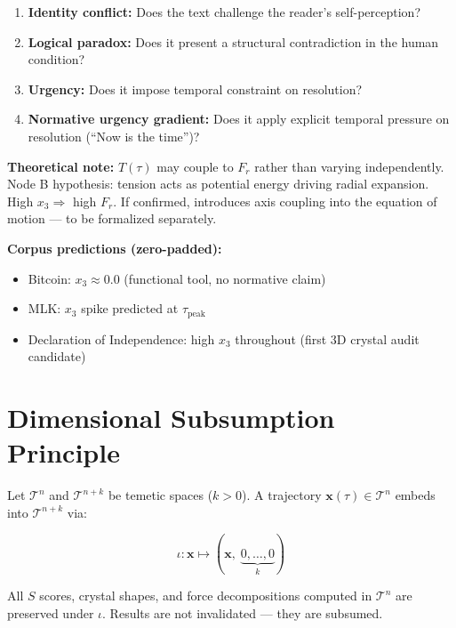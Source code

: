 \documentclass{article}
\begin{document}
\begin{enumerate}
  \item \textbf{Identity conflict:} Does the text challenge
    the reader's self-perception?
  \item \textbf{Logical paradox:} Does it present a structural
    contradiction in the human condition?
  \item \textbf{Urgency:} Does it impose temporal constraint
    on resolution?
  \item \textbf{Normative urgency gradient:} Does it apply
    explicit temporal pressure on resolution
    (``Now is the time'')?
\end{enumerate}

\textbf{Theoretical note:} $T(\tau)$ may couple to $F_r$ rather
than varying independently. Node B hypothesis: tension acts as
potential energy driving radial expansion. High $x_3 \Rightarrow$
high $F_r$. If confirmed, introduces axis coupling into the
equation of motion --- to be formalized separately.

\textbf{Corpus predictions (zero-padded):}
\begin{itemize}
  \item Bitcoin: $x_3 \approx 0.0$ (functional tool, no normative claim)
  \item MLK: $x_3$ spike predicted at $\tau_{\text{peak}}$
  \item Declaration of Independence: high $x_3$ throughout
    (first 3D crystal audit candidate)
\end{itemize}

\section{Dimensional Subsumption Principle}

Let $\mathcal{T}^n$ and $\mathcal{T}^{n+k}$ be temetic spaces
($k > 0$). A trajectory $\mathbf{x}(\tau) \in \mathcal{T}^n$
embeds into $\mathcal{T}^{n+k}$ via:

\begin{equation}
\iota: \mathbf{x} \mapsto
  \left(\mathbf{x},\; \underbrace{0, \ldots, 0}_{k}\right)
\end{equation}

All $S$ scores, crystal shapes, and force decompositions computed
in $\mathcal{T}^n$ are preserved under $\iota$. Results are not
invalidated --- they are subsumed.
\end{document}

